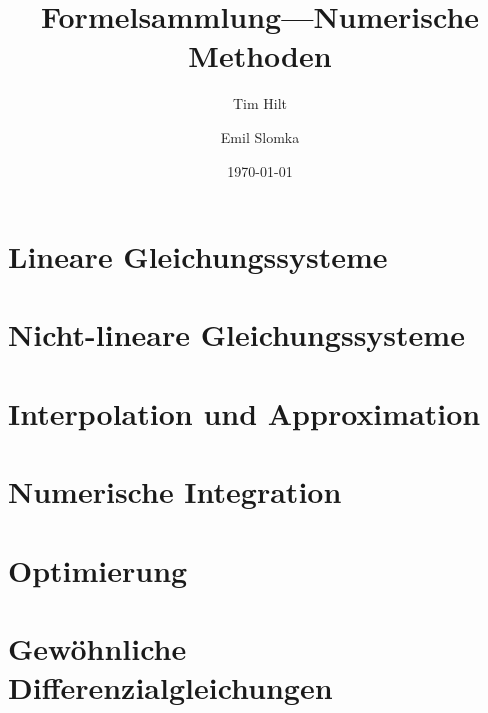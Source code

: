 \documentclass{article}
\title{Formelsammlung---Numerische Methoden}
\author{Tim Hilt \and Emil Slomka}
\date{\today}
\begin{document}
    
\maketitle
\tableofcontents

\section{Lineare Gleichungssysteme}

\section{Nicht-lineare Gleichungssysteme}

\section{Interpolation und Approximation}

\section{Numerische Integration}

\section{Optimierung}

\section{Gewöhnliche Differenzialgleichungen}
\end{document}
